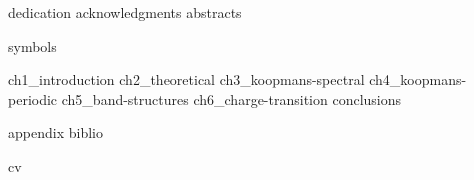 \documentclass[a4paper,11pt]{book}
\begin{document}
\setlength{\parindent}{0pt}
\frontmatter


\setlength{\parskip}{0.5em}

{dedication}
\clearpage
\setcounter{page}{0}
{acknowledgments}
{abstracts}

\setlength{\parskip}{0pt}

\cleardoublepage
{}
{\hypersetup{hidelinks} \tableofcontents}

\cleardoublepage
{}
{}
{\hypersetup{hidelinks} \listoffigures}
 
\cleardoublepage
{}
{}
{\hypersetup{hidelinks} \listoftables}

\cleardoublepage
{}
{symbols}

\setlength{\parskip}{1em}


\mainmatter
%
{ch1_introduction}
\cleardoublepage
%
{ch2_theoretical}
\cleardoublepage
%
{ch3_koopmans-spectral}
\cleardoublepage
%
{ch4_koopmans-periodic}
\cleardoublepage
%
{ch5_band-structures}
\cleardoublepage
%
{ch6_charge-transition}
\cleardoublepage
%
{conclusions}
\cleardoublepage

\cleardoublepage
{}


{appendix}
\backmatter
{biblio}

\cleardoublepage
{cv}
\end{document}
